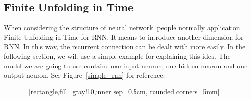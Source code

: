 \documentclass[officiallayout]{tktla}
\begin{document}
\subsection{Finite Unfolding in Time}
When considering the structure of neural network, people normally application Finite Unfolding in Time for RNN. It means to introduce another dimension for RNN. In this way, the recurrent connection can be dealt with more easily.  In the following section, we will use a simple example for explaining this idea. The model we are going to use contains one input neuron, one hidden neuron and one output neuron. See Figure~\ref{simple_rnn} for reference.



\begin{figure}[h!]
\centering
{}=[rectangle,fill=gray!10,inner sep=0.5cm, rounded corners=5mm]
\end{figure}
\end{document}
